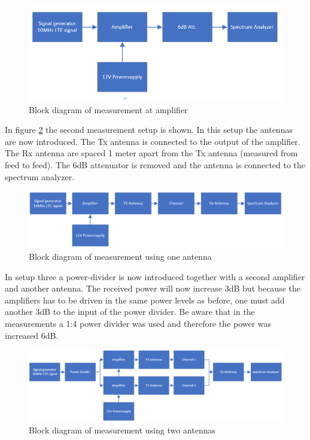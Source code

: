 \begin{figure}[H]
\centering 
\includegraphics[scale = 0.6]{figures/measurement/meas_set_1.png}
\caption{Block diagram of measurement at amplifier }
\label{fig:Meas_setup1}
\end{figure} 

In figure \ref{fig:Meas_setup2} the second measurement setup is shown. In this setup the antennas are now introduced. The Tx antenna is connected to the output of the amplifier. The Rx antenna are spaced 1 meter apart from the Tx antenna (measured from feed to feed). The 6dB attenuator is removed and the antenna is connected to the spectrum analyzer. 


\begin{figure}[H]
\centering 
\includegraphics[scale = 0.6]{figures/measurement/meas_set_2.png}
\caption{Block diagram of measurement using one antenna}
\label{fig:Meas_setup2}
\end{figure} 

In setup three a power-divider is now introduced together with a second amplifier and another antenna. The received power will now increase 3dB but because the amplifiers has to be driven in the same power levels as before, one must add another 3dB to the input of the power divider. Be aware that in the measurements a 1:4 power divider was used and therefore the power was increased 6dB. 

\begin{figure}[H]
\centering 
\includegraphics[scale = 0.6]{figures/measurement/meas_set_3.png}
\caption{Block diagram of measurement using two antennas}
\label{fig:Meas_setup3}
\end{figure} 


